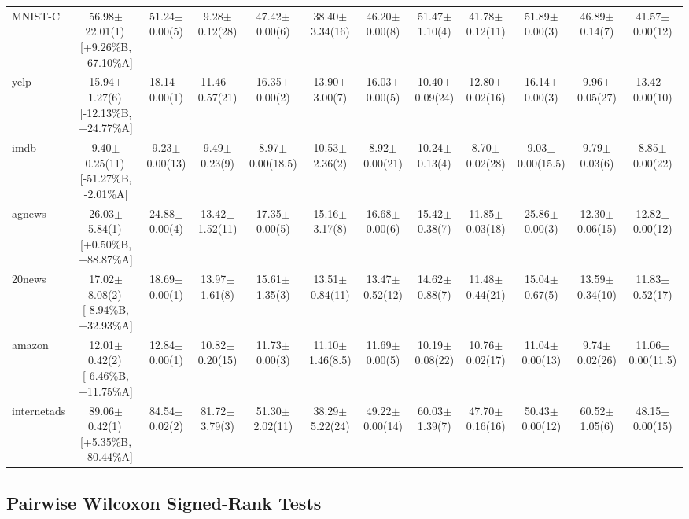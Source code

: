 \documentclass[conference]{IEEEtran}
\begin{document}
\begin{table}
{\begin{tabular}{lccccccccccc}
				MNIST-C & 56.98$\pm$22.01(1)\,[{+}9.26\%B, {+}67.10\%A] & 51.24$\pm$0.00(5) & 9.28$\pm$0.12(28) & 47.42$\pm$0.00(6) & 38.40$\pm$3.34(16) & 46.20$\pm$0.00(8) & 51.47$\pm$1.10(4) & 41.78$\pm$0.12(11) & 51.89$\pm$0.00(3) & 46.89$\pm$0.14(7) & 41.57$\pm$0.00(12) \\
				yelp & 15.94$\pm$1.27(6)\,[{-}12.13\%B, {+}24.77\%A] & 18.14$\pm$0.00(1) & 11.46$\pm$0.57(21) & 16.35$\pm$0.00(2) & 13.90$\pm$3.00(7) & 16.03$\pm$0.00(5) & 10.40$\pm$0.09(24) & 12.80$\pm$0.02(16) & 16.14$\pm$0.00(3) & 9.96$\pm$0.05(27) & 13.42$\pm$0.00(10) \\
				imdb & 9.40$\pm$0.25(11)\,[{-}51.27\%B, {-}2.01\%A] & 9.23$\pm$0.00(13) & 9.49$\pm$0.23(9) & 8.97$\pm$0.00(18.5) & 10.53$\pm$2.36(2) & 8.92$\pm$0.00(21) & 10.24$\pm$0.13(4) & 8.70$\pm$0.02(28) & 9.03$\pm$0.00(15.5) & 9.79$\pm$0.03(6) & 8.85$\pm$0.00(22) \\
				agnews & 26.03$\pm$5.84(1)\,[{+}0.50\%B, {+}88.87\%A] & 24.88$\pm$0.00(4) & 13.42$\pm$1.52(11) & 17.35$\pm$0.00(5) & 15.16$\pm$3.17(8) & 16.68$\pm$0.00(6) & 15.42$\pm$0.38(7) & 11.85$\pm$0.03(18) & 25.86$\pm$0.00(3) & 12.30$\pm$0.06(15) & 12.82$\pm$0.00(12) \\
				20news & 17.02$\pm$8.08(2)\,[{-}8.94\%B, {+}32.93\%A] & 18.69$\pm$0.00(1) & 13.97$\pm$1.61(8) & 15.61$\pm$1.35(3) & 13.51$\pm$0.84(11) & 13.47$\pm$0.52(12) & 14.62$\pm$0.88(7) & 11.48$\pm$0.44(21) & 15.04$\pm$0.67(5) & 13.59$\pm$0.34(10) & 11.83$\pm$0.52(17) \\
				amazon & 12.01$\pm$0.42(2)\,[{-}6.46\%B, {+}11.75\%A] & 12.84$\pm$0.00(1) & 10.82$\pm$0.20(15) & 11.73$\pm$0.00(3) & 11.10$\pm$1.46(8.5) & 11.69$\pm$0.00(5) & 10.19$\pm$0.08(22) & 10.76$\pm$0.02(17) & 11.04$\pm$0.00(13) & 9.74$\pm$0.02(26) & 11.06$\pm$0.00(11.5) \\
				internetads & 89.06$\pm$0.42(1)\,[{+}5.35\%B, {+}80.44\%A] & 84.54$\pm$0.02(2) & 81.72$\pm$3.79(3) & 51.30$\pm$2.02(11) & 38.29$\pm$5.22(24) & 49.22$\pm$0.00(14) & 60.03$\pm$1.39(7) & 47.70$\pm$0.16(16) & 50.43$\pm$0.00(12) & 60.52$\pm$1.05(6) & 48.15$\pm$0.00(15) \\
				\bottomrule
			\end{tabular}%
		}
	\end{table}
	
	\subsection{Pairwise Wilcoxon Signed-Rank Tests}
	\label{app:wilcoxon}
\end{document}
